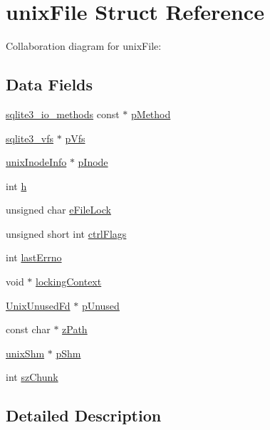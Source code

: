 \hypertarget{structunix_file}{}\section{unix\+File Struct Reference}
\label{structunix_file}


Collaboration diagram for unix\+File\+:
\subsection*{Data Fields}
\begin{DoxyCompactItemize}
\item 
\hyperlink{structsqlite3__io__methods}{sqlite3\+\_\+io\+\_\+methods} const $\ast$ \hyperlink{structunix_file_a4543ba4f315142783b138112898c5c59}{p\+Method}
\item 
\hyperlink{structsqlite3__vfs}{sqlite3\+\_\+vfs} $\ast$ \hyperlink{structunix_file_a59603ca1cedf2bda0ee4e65eb610a0b5}{p\+Vfs}
\item 
\hyperlink{structunix_inode_info}{unix\+Inode\+Info} $\ast$ \hyperlink{structunix_file_afe19cb877f2c3a50ca04a8272ed435b8}{p\+Inode}
\item 
int \hyperlink{structunix_file_a16611451551e3d15916bae723c3f59f7}{h}
\item 
unsigned char \hyperlink{structunix_file_a074528e86f4417f8c3ce538e07908824}{e\+File\+Lock}
\item 
unsigned short int \hyperlink{structunix_file_a703267dc2b2f5100ed329cc2bfab7699}{ctrl\+Flags}
\item 
int \hyperlink{structunix_file_aabab360690091497ac312b35a13e4c56}{last\+Errno}
\item 
void $\ast$ \hyperlink{structunix_file_aab5edf9be7a69d30e33ed8d8a89291ea}{locking\+Context}
\item 
\hyperlink{struct_unix_unused_fd}{Unix\+Unused\+Fd} $\ast$ \hyperlink{structunix_file_a7ecad57bed967765906dd7d10af97be1}{p\+Unused}
\item 
const char $\ast$ \hyperlink{structunix_file_adfe0c5350fc7ff271fd542aa50bdc259}{z\+Path}
\item 
\hyperlink{structunix_shm}{unix\+Shm} $\ast$ \hyperlink{structunix_file_aa155aff7111790d83ffdb16892b15dae}{p\+Shm}
\item 
int \hyperlink{structunix_file_aec8d343f93783cd4e6a649d4b157ac8c}{sz\+Chunk}
\end{DoxyCompactItemize}


\subsection{Detailed Description}


